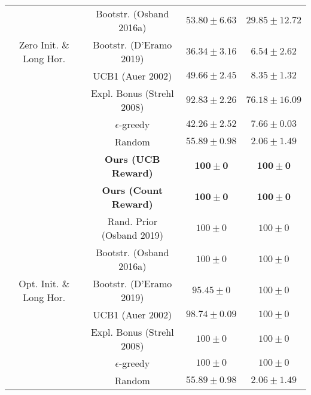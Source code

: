 \documentclass{article}
\begin{document}
\begin{table}[h]
\begin{tabular}{ c | c | c c }
		& Bootstr. (Osband 2016a) & $53.80 \pm 6.63$ & $29.85 \pm 12.72$ \\
		Zero Init. \& Long Hor. & Bootstr. (D'Eramo 2019) & $36.34 \pm 3.16$ & $6.54 \pm 2.62$ \\
		& UCB1 (Auer 2002) & $49.66 \pm 2.45$ & $8.35 \pm 1.32$ \\
		& Expl. Bonus (Strehl 2008) & $92.83 \pm 2.26$ & $76.18 \pm 16.09$ \\
		& $\epsilon$-greedy & $42.26 \pm 2.52$ & $7.66 \pm 0.03$ \\
		& Random & $55.89 \pm 0.98$ & $2.06 \pm 1.49$ \\
		\hline
		& \textbf{Ours (UCB Reward)} & $\mathbf{100 \pm 0}$ & $\mathbf{100 \pm 0}$ \\
		& \textbf{Ours (Count Reward)} & $\mathbf{100 \pm 0}$ & $\mathbf{100 \pm 0}$ \\
		& Rand. Prior (Osband 2019) & $100 \pm 0$ & $100 \pm 0$ \\
		& Bootstr. (Osband 2016a) & $100 \pm 0$ & $100 \pm 0$ \\
		Opt. Init. \& Long Hor. & Bootstr. (D'Eramo 2019) & $95.45 \pm 0$ & $100 \pm 0$ \\
		& UCB1 (Auer 2002) & $98.74 \pm 0.09$ & $100 \pm 0$ \\
		& Expl. Bonus (Strehl 2008) & $100 \pm 0$ & $100 \pm 0$ \\
		& $\epsilon$-greedy & $100 \pm 0$ & $100 \pm 0$ \\
		& Random & $55.89 \pm 0.98$ & $2.06 \pm 1.49$ \\
	\end{tabular}
\end{table}
\end{document}
